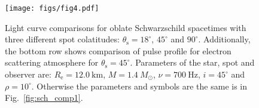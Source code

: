 \documentclass{aa}
\newcommand{\sch}{Schwarzschild }
\newcommand{\Msun}{\ensuremath{M_{\odot}}}
\begin{document}



\begin{figure}
\centering
\texttt{[image: figs/fig4.pdf]}
\caption{\label{fig:osch_comp700}
  Light curve comparisons for oblate \sch spacetimes with three different spot colatitudes: $\theta_{\mathrm{s}} = 18^{\circ}$, $45^{\circ}$ and $90^{\circ}$.
  Additionally, the bottom row shows comparison of pulse profile for electron scattering atmosphere for $\theta_{\mathrm{s}} = 45^{\circ}$.
  Parameters of the star, spot and observer are: $R_{\mathrm{e}} = 12.0~\mathrm{km}$, $M = 1.4~\Msun$, $\nu = 700~\mathrm{Hz}$, $i = 45^{\circ}$ and $\rho = 10^{\circ}$.
  Otherwise the parameters and symbols are the same is in Fig.~\ref{fig:sch_comp1}.
  }
\end{figure}
\end{document}
